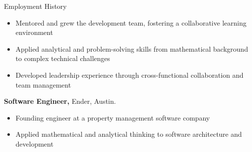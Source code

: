 \begin{rubric}{Employment History}
	\begin{itemize}
		\item Mentored and grew the development team, fostering a collaborative learning environment
		\item Applied analytical and problem-solving skills from mathematical background to complex technical challenges
		\item Developed leadership experience through cross-functional collaboration and team management
	\end{itemize}
%
%
	\textbf{Software Engineer,} Ender, Austin.
	\begin{itemize}
		\item Founding engineer at a property management software company
		\item Applied mathematical and analytical thinking to software architecture and development
	\end{itemize}
%
\end{rubric}
